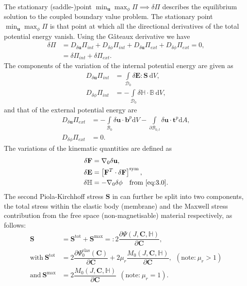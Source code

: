 The stationary (saddle-)point $\min_{\mathbf{u}} \max_{\phi} \Pi \implies \delta \Pi$ describes the equilibrium solution to the coupled boundary value problem. The stationary point $\min_{\mathbf{u}} \max_{\phi} \Pi$ is that point at which all the directional derivatives of the total potential energy vanish. Using the G\^ateaux derivative we have
\begin{align}
\delta \Pi &= D_{\delta \mathbf{u}} \Pi_{int} + D_{\delta \phi} \Pi_{int} + D_{\delta \mathbf{u}} \Pi_{ext} + D_{\delta \phi} \Pi_{ext} = 0, \label{eq:3.25} \\
&= \delta \Pi_{int} + \delta \Pi_{ext}. \nonumber
\end{align}
The components of the variation of the internal potential energy are given as \cite{Saxena2015}
\begin{align}
D_{\delta \mathbf{u}} \Pi_{int} &= \int\limits_{\mathcal{D}_0} \delta \mathbf{E} : \mathbf{S} \ \mathrm{d}V, \label{eq:3.26.1}\\
D_{\delta \phi} \Pi_{int} &= -\int\limits_{\mathcal{D}_0} \delta \mathbb{H} \cdot \mathbb{B} \ \mathrm{d}V,
\label{eq:3.26.2}
\end{align}
and that of the external potential energy are
\begin{align}
D_{\delta \mathbf{u}} \Pi_{ext} &= -\int\limits_{\mathcal{B}_0} \delta \mathbf{u} \cdot \mathbf{b}^p \mathrm{d}V - \int\limits_{\partial \mathcal{B}_{0,t}} \delta \mathbf{u} \cdot \mathbf{t}^p \mathrm{d}A, \label{eq:3.27.1}\\
D_{\delta \phi} \Pi_{ext} &= 0.
\label{eq:3.27.2}
\end{align}
The variations of the kinematic quantities are defined as 
\begin{align}
\delta \mathbf{F} &= \nabla_0 \delta \mathbf{u}, \\
\delta \mathbf{E} &= \left[ \mathbf{F}^T \cdot \delta \mathbf{F} \right]^{\text{sym}}, \\ 
\delta \mathbb{H} &= -\nabla_0 \delta \phi \ \ \text{ from \Cref{eq:3.0}}.
\label{eq:3.28}
\end{align}
The second Piola-Kirchhoff stress $\mathbf{S}$ in  can further be split into two components, the total stress within the elastic body (membrane) and the Maxwell stress contribution from the free space (non-magnetisable) material respectively, as follows:
\begin{align}
\mathbf{S} &= \mathbf{S}^{\text{tot}} + \mathbf{S}^{\text{max}} =: 2 \dfrac{\partial \Psi (J, \mathbf{C}, \mathbb{H})}{\partial \mathbf{C}}, \\
\text{with} \ \mathbf{S}^{\text{tot}} &= 2 \dfrac{\partial \Psi_0^{\text{elas}} (\mathbf{C})}{\partial \mathbf{C}} + 2 \mu_r \dfrac{M_0 (J, \mathbf{C}, \mathbb{H})}{\partial \mathbf{C}}, \ \ (\text{note:} \ \mu_r > 1)\\
\text{and} \ \mathbf{S}^{\text{max}} &= 2 \dfrac{M_0 (J, \mathbf{C}, \mathbb{H})}{\partial \mathbf{C}}  \ \ (\text{note:} \ \mu_r = 1).
\end{align}
